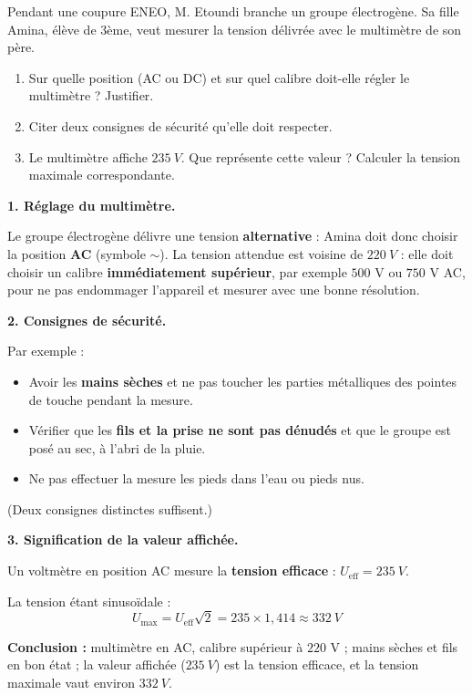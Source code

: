 \documentclass[11pt]{article}
\begin{document}
\begin{exoresolu}
Pendant une coupure ENEO, M. Etoundi branche un groupe électrogène. Sa fille Amina, élève de 3ème, veut mesurer la tension délivrée avec le multimètre de son père.
\begin{enumerate}
\item Sur quelle position (AC ou DC) et sur quel calibre doit-elle régler le multimètre ? Justifier.
\item Citer deux consignes de sécurité qu'elle doit respecter.
\item Le multimètre affiche $\SI{235}{V}$. Que représente cette valeur ? Calculer la tension maximale correspondante.
\end{enumerate}
\tcblower
\textbf{1. Réglage du multimètre.}

Le groupe électrogène délivre une tension \textbf{alternative} : Amina doit donc choisir la position \textbf{AC} (symbole $\sim$). La tension attendue est voisine de $\SI{220}{V}$ : elle doit choisir un calibre \textbf{immédiatement supérieur}, par exemple $500$ V ou $750$ V AC, pour ne pas endommager l'appareil et mesurer avec une bonne résolution.

\textbf{2. Consignes de sécurité.}

Par exemple :
\begin{itemize}
\item Avoir les \textbf{mains sèches} et ne pas toucher les parties métalliques des pointes de touche pendant la mesure.
\item Vérifier que les \textbf{fils et la prise ne sont pas dénudés} et que le groupe est posé au sec, à l'abri de la pluie.
\item Ne pas effectuer la mesure les pieds dans l'eau ou pieds nus.
\end{itemize}
(Deux consignes distinctes suffisent.)

\textbf{3. Signification de la valeur affichée.}

Un voltmètre en position AC mesure la \textbf{tension efficace} : $U_{\text{eff}} = \SI{235}{V}$.

La tension étant sinusoïdale :
\[ U_{\text{max}} = U_{\text{eff}}\sqrt{2} = 235 \times 1,414 \approx \SI{332}{V} \]

\textbf{Conclusion :} multimètre en AC, calibre supérieur à $220$ V ; mains sèches et fils en bon état ; la valeur affichée ($\SI{235}{V}$) est la tension efficace, et la tension maximale vaut environ $\SI{332}{V}$.
\end{exoresolu}
\end{document}
